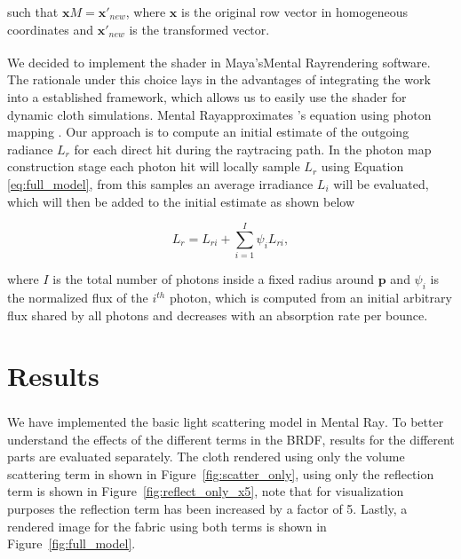 \documentclass[12pt]{article}
\begin{document}
such that $\mathbf{x}M=\mathbf{x}'_{new}$, where $\mathbf{x}$ is the original row vector in homogeneous coordinates and $\mathbf{x}'_{new}$ is the transformed vector.

We decided to implement the shader in Maya's\textsuperscript\textregistered Mental Ray\textsuperscript\textregistered rendering software.
The rationale under this choice lays in the advantages of integrating the work into a established framework, which allows us to easily use the shader for dynamic cloth simulations.
Mental Ray\texttrademark approximates \citeauthor{Kajiya1986}'s equation \cite{Kajiya1986} using photon mapping \cite{Jensen1996}.
Our approach is to compute an initial estimate of the outgoing radiance $L_{r}$ for each direct hit during the raytracing path.
In the photon map construction stage each photon hit will locally sample $L_{r}$ using Equation \ref{eq:full_model}, from this samples an average irradiance $L_i$ will be evaluated, which will then be added to the initial estimate as shown below

\begin{equation}
L_r = L_{ri} + \sum_{i = 1}^{I} \psi_i L_{ri},
\end{equation}

where $I$ is the total number of photons inside a fixed radius around $\mathbf{p}$ and $\psi_i$ is the normalized flux of the $i^{th}$ photon, which is computed from an initial arbitrary flux shared by all photons and decreases with an absorption rate per bounce.

\section{Results}

We have implemented the basic light scattering model in Mental Ray\textsuperscript\textregistered.
To better understand the effects of the different terms in the BRDF, results for the different parts are evaluated separately.
The cloth rendered using only the volume scattering term in shown in Figure~\ref{fig:scatter_only}, using only the reflection term is shown in Figure~\ref{fig:reflect_only_x5}, note that for visualization purposes the reflection term has been increased by a factor of 5.
Lastly, a rendered image for the fabric using both terms is shown in Figure~\ref{fig:full_model}.
\end{document}
